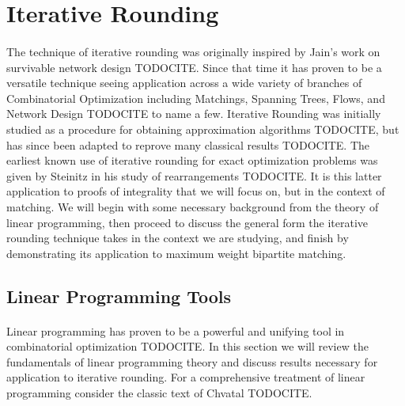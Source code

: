 \section{Iterative Rounding}
\paragraph{}
The technique of iterative rounding was originally inspired by Jain's work on survivable network design TODOCITE. Since that time it has proven to be a versatile technique seeing application across a wide variety of branches of Combinatorial Optimization including Matchings, Spanning Trees, Flows, and Network Design TODOCITE to name a few. Iterative Rounding was initially studied as a procedure for obtaining approximation algorithms TODOCITE, but has since been adapted to reprove many classical results TODOCITE. The earliest known use of iterative rounding for exact optimization problems was given by Steinitz in his study of rearrangements TODOCITE. It is this latter application to proofs of integrality that we will focus on, but in the context of matching. We will begin with some necessary background from the theory of linear programming, then proceed to discuss the general form the iterative rounding technique takes in the context we are studying, and finish by demonstrating its application to maximum weight bipartite matching.
\subsection{Linear Programming Tools}
\paragraph{}
Linear programming has proven to be a powerful and unifying tool in combinatorial optimization TODOCITE. In this section we will review the fundamentals of linear programming theory and discuss results necessary for application to iterative rounding. For a comprehensive treatment of linear programming consider the classic text of Chvatal TODOCITE.
